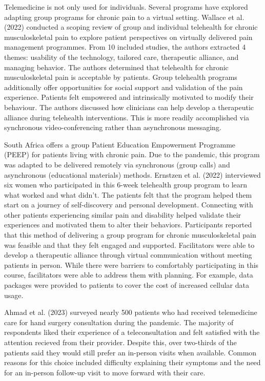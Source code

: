\documentclass[
  letterpaper,
]{article}
\begin{document}
Telemedicine is not only used for individuals. Several programs have
explored adapting group programs for chronic pain to a virtual setting.
Wallace et al. (2022) conducted a scoping review of group and individual
telehealth for chronic musculoskeletal pain to explore patient
perspectives on virtually delivered pain management programmes. From 10
included studies, the authors extracted 4 themes: usability of the
technology, tailored care, therapeutic alliance, and managing behavior.
The authors determined that telehealth for chronic musculoskeletal pain
is acceptable by patients. Group telehealth programs additionally offer
opportunities for social support and validation of the pain experience.
Patients felt empowered and intrinsically motivated to modify their
behaviour. The authors discussed how clinicians can help develop a
therapeutic alliance during telehealth interventions. This is more
readily accomplished via synchronous video-conferencing rather than
asynchronous messaging.

South Africa offers a group Patient Education Empowerment Programme
(PEEP) for patients living with chronic pain. Due to the pandemic, this
program was adapted to be delivered remotely via synchronous (group
calls) and asynchronous (educational materials) methods. Ernstzen et al.
(2022) interviewed six women who participated in this 6-week telehealth
group program to learn what worked and what didn't. The patients felt
that the program helped them start on a journey of self-discovery and
personal development. Connecting with other patients experiencing
similar pain and disability helped validate their experiences and
motivated them to alter their behaviors. Participants reported that this
method of delivering a group program for chronic musculoskeletal pain
was feasible and that they felt engaged and supported. Facilitators were
able to develop a therapeutic alliance through virtual communication
without meeting patients in person. While there were barriers to
comfortably participating in this course, facilitators were able to
address them with planning. For example, data packages were provided to
patients to cover the cost of increased cellular data usage.

Ahmad et al. (2023) surveyed nearly 500 patients who had received
telemedicine care for hand surgery consultation during the pandemic. The
majority of respondents liked their experience of a teleconsultation and
felt satisfied with the attention recieved from their provider. Despite
this, over two-thirds of the patients said they would still prefer an
in-person visits when available. Common reasons for this choice included
difficulty explaining their symptoms and the need for an in-person
follow-up visit to move forward with their care.
\end{document}
